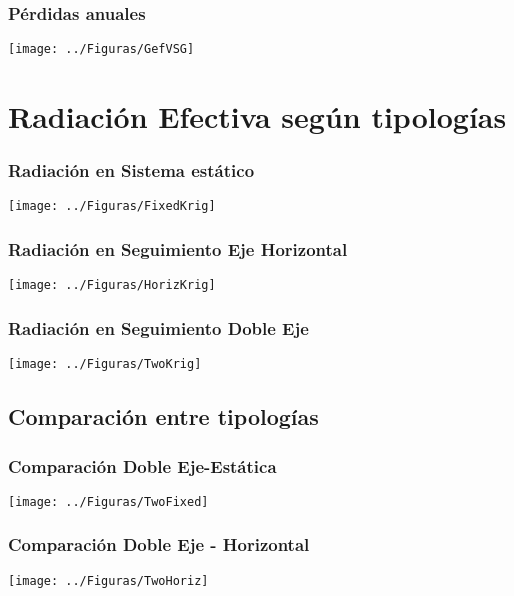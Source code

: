 \documentclass[serif, xcolor=dvipsnames]{beamer}
\begin{document}
\begin{frame}
\frametitle{Pérdidas anuales}

\begin{center}
\texttt{[image: ../Figuras/GefVSG]}
\par\end{center}


\end{frame}

\section{Radiación Efectiva según tipologías}

\begin{frame}[plain]
  \frametitle{Radiación en Sistema estático}

  \texttt{[image: ../Figuras/FixedKrig]}
\end{frame}

\begin{frame}[plain]
  \frametitle{Radiación en Seguimiento Eje Horizontal}

  \texttt{[image: ../Figuras/HorizKrig]}

\end{frame}

\begin{frame}[plain]
  \frametitle{Radiación en Seguimiento Doble Eje}

  \texttt{[image: ../Figuras/TwoKrig]}

\end{frame}

\subsection{Comparación entre tipologías}

\begin{frame}[plain]
  \frametitle{Comparación Doble Eje-Estática}

  \texttt{[image: ../Figuras/TwoFixed]}


\end{frame}

\begin{frame}[plain]
  \frametitle{Comparación Doble Eje - Horizontal}

    \texttt{[image: ../Figuras/TwoHoriz]}

\end{frame}
\end{document}
